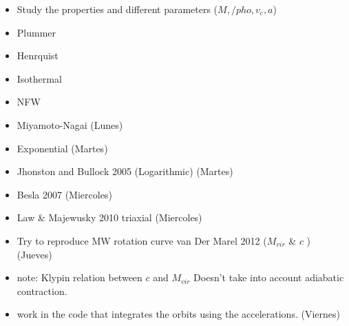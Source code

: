 \documentclass[a4paper, 12pt]{article} %
\begin{document}
\begin{itemize}

\item Study the properties and different parameters ($M, /pho, v_c, a$)

\item Plummer
\item Henrquist
\item Isothermal
\item NFW
\item Miyamoto-Nagai (Lunes)
\item Exponential (Martes)
\item Jhonston and Bullock 2005 (Logarithmic) (Martes)
\item Besla 2007 (Miercoles)
\item Law \& Majewusky 2010 triaxial (Miercoles)

\item Try to reproduce MW rotation curve van Der Marel 2012 ($M_{vir}$ \& $c$ ) (Jueves)


\item note: Klypin relation between $c$ and $M_{vir}$ Doesn't take into 
account adiabatic contraction. 

\item work in the code that integrates the orbits using the accelerations. (Viernes)

\end{itemize}
\end{document}
